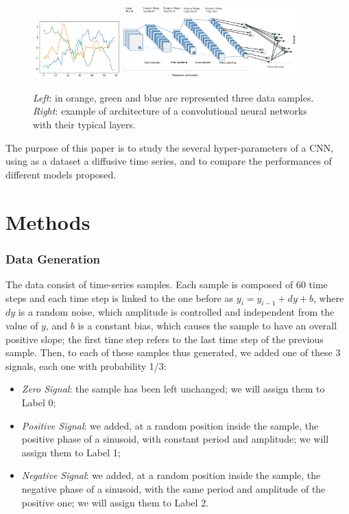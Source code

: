 \documentclass[prl, twocolumn]{revtex4-1}
\begin{document}
\begin{figure}[!tb]
    \centering
    \includegraphics[width=0.3\textwidth]{pics/data_ex.png}
    \hspace{1cm}
    \includegraphics[width=0.6\textwidth]{pics/figure1.png}
    \caption{\textit{Left}: in orange, green and blue are represented three data samples. \textit{Right}: example of architecture of a convolutional neural networks with their typical layers.}
    \label{fig:fig1}
\end{figure}


The purpose of this paper is to study the several hyper-parameters of a CNN, using as a dataset a diffusive time series, and to compare the performances of different models proposed. 

\section{Methods}

\subsubsection{Data Generation}
The data consist of time-series samples. Each sample is composed of 60 time steps and each time step is linked to the one before as $y_i = y_{i-1} + dy + b$, where $dy$ is a random noise, which amplitude is controlled and independent from the value of $y$, and $b$ is a constant bias, which causes the sample to have an overall positive slope; the first time step refers to the last time step of the previous sample. Then, to each of these samples thus generated, we added one of these 3 signals, each one with probability 1/3:
\begin{itemize}
    \item \textit{Zero Signal}: the sample has been left unchanged; we will assign them to Label 0;
    \item \textit{Positive Signal}: we added, at a random position inside the sample, the positive phase of a sinusoid, with constant period and amplitude; we will assign them to Label 1;
    \item \textit{Negative Signal}: we added, at a random position inside the sample, the negative phase of a sinusoid, with the same period and amplitude of the positive one; we will assign them to Label 2.
\end{itemize}
\end{document}
